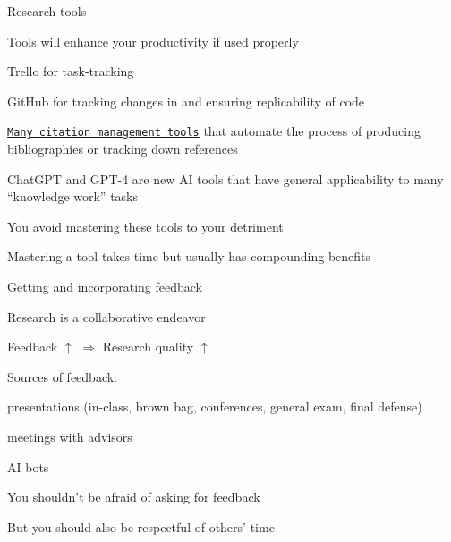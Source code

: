 \documentclass[notes,12pt, aspectratio=169]{beamer}
\newenvironment{wideitemize}{\itemize\addtolength{\itemsep}{15pt}}{\enditemize}
\begin{document}
\begin{frame}{Research tools}
\begin{wideitemize}
\item Tools will enhance your productivity if used properly
    \begin{wideitemize}
    \vspace{5mm}
    \item Trello for task-tracking
    \item GitHub for tracking changes in and ensuring replicability of code
    \item \textcolor{oucrimson}{\href{https://guides.library.upenn.edu/citationmgmt}{\texttt{Many citation management tools}}} that automate the process of producing bibliographies or tracking down references
    \item ChatGPT and GPT-4 are new AI tools that have general applicability to many ``knowledge work'' tasks
    \end{wideitemize}
\item You avoid mastering these tools to your detriment
\item Mastering a tool takes time but usually has compounding benefits
\end{wideitemize}
\end{frame}



\begin{frame}{Getting and incorporating feedback}
\begin{wideitemize}
\item Research is a collaborative endeavor
\item Feedback $\uparrow$ $\Rightarrow$ Research quality $\uparrow$
\item Sources of feedback:
    \begin{wideitemize}
    \vspace{5mm}
    \item presentations (in-class, brown bag, conferences, general exam, final defense)
    \item meetings with advisors
    \item AI bots
    \end{wideitemize}
\item You shouldn't be afraid of asking for feedback
\item But you should also be respectful of others' time
\end{wideitemize}
\end{frame}
\end{document}
